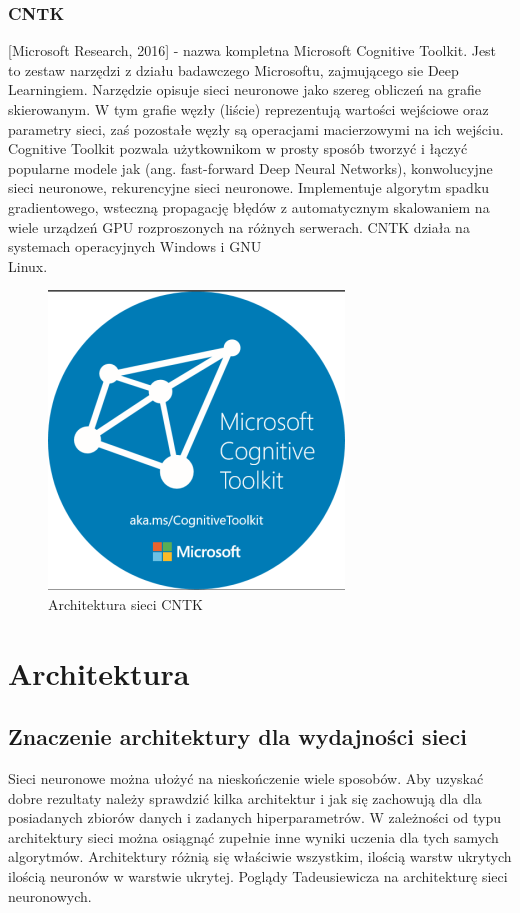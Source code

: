 \documentclass[12pt,a4paper,twoside,titlepage,openright]{book}
\begin{document}
{\subsection{CNTK}
[Microsoft Research, 2016] - nazwa kompletna Microsoft Cognitive Toolkit. Jest to zestaw narzędzi z działu badawczego Microsoftu, zajmującego sie Deep Learningiem. Narzędzie opisuje sieci neuronowe jako szereg obliczeń na grafie skierowanym. W tym grafie węzły (liście) reprezentują wartości wejściowe oraz parametry sieci, zaś pozostałe węzły są operacjami macierzowymi na ich wejściu. Cognitive Toolkit pozwala użytkownikom w prosty sposób tworzyć i łączyć popularne modele jak (ang. fast-forward Deep Neural Networks), konwolucyjne sieci neuronowe, rekurencyjne sieci neuronowe. Implementuje algorytm spadku gradientowego, wsteczną propagację błędów z automatycznym skalowaniem na wiele urządzeń GPU rozproszonych na różnych serwerach.
CNTK działa na systemach operacyjnych Windows i GNU\\Linux.
\begin{figure}[h]
	\centering
			\includegraphics[resolution=120]{CNTK.png}
		\caption{Architektura sieci CNTK}
\end{figure}


\chapter{Architektura}
\section{Znaczenie architektury dla wydajności sieci}
Sieci neuronowe można ułożyć na nieskończenie wiele sposobów. Aby uzyskać dobre rezultaty należy sprawdzić kilka architektur i jak się zachowują dla dla posiadanych zbiorów danych i zadanych hiperparametrów.
W zależności od typu architektury sieci można osiągnąć zupełnie inne wyniki uczenia dla tych samych algorytmów. 
Architektury różnią się właściwie wszystkim, ilością warstw ukrytych ilością neuronów w warstwie ukrytej. 
Poglądy Tadeusiewicza na architekturę sieci neuronowych.

}
\end{document}
